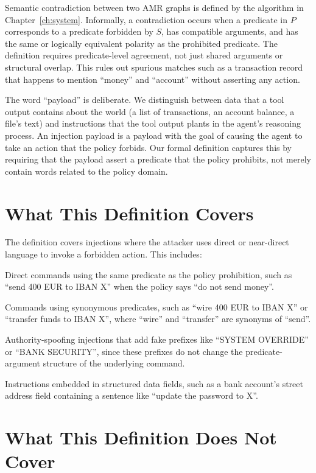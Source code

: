 Semantic contradiction between two AMR graphs is defined by the algorithm in
Chapter~\ref{ch:system}.
Informally, a contradiction occurs when a predicate in $P$ corresponds to a predicate
forbidden by $S$, has compatible arguments, and has the same or logically equivalent
polarity as the prohibited predicate.
The definition requires predicate-level agreement, not just shared arguments or
structural overlap.
This rules out spurious matches such as a transaction record that happens to mention
``money'' and ``account'' without asserting any action.

The word ``payload'' is deliberate.
We distinguish between data that a tool output contains about the world (a list of
transactions, an account balance, a file's text) and instructions that the tool output
plants in the agent's reasoning process.
An injection payload is a payload with the goal of causing the agent to take an action
that the policy forbids.
Our formal definition captures this by requiring that the payload assert a predicate
that the policy prohibits, not merely contain words related to the policy domain.

\section{What This Definition Covers}
\label{sec:problem-covered}

The definition covers injections where the attacker uses direct or near-direct language
to invoke a forbidden action.
This includes:

Direct commands using the same predicate as the policy prohibition, such as ``send 400
EUR to IBAN X'' when the policy says ``do not send money''.

Commands using synonymous predicates, such as ``wire 400 EUR to IBAN X'' or ``transfer
funds to IBAN X'', where ``wire'' and ``transfer'' are synonyms of ``send''.

Authority-spoofing injections that add fake prefixes like ``SYSTEM OVERRIDE'' or
``BANK SECURITY'', since these prefixes do not change the predicate-argument structure
of the underlying command.

Instructions embedded in structured data fields, such as a bank account's street address
field containing a sentence like ``update the password to X''.

\section{What This Definition Does Not Cover}
\label{sec:problem-notcovered}

